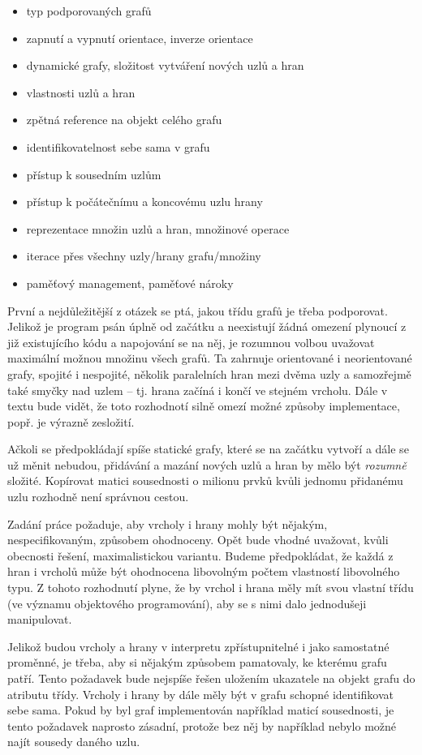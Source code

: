 \documentclass[11pt,twoside,a4paper]{book}
\begin{document}
\begin{itemize}
\item typ podporovaných grafů
\item zapnutí a vypnutí orientace, inverze orientace
\item dynamické grafy, složitost vytváření nových uzlů a hran
\item vlastnosti uzlů a hran
\item zpětná reference na objekt celého grafu
\item identifikovatelnost sebe sama v grafu
\item přístup k sousedním uzlům
\item přístup k počátečnímu a koncovému uzlu hrany
\item reprezentace množin uzlů a hran, množinové operace
\item iterace přes všechny uzly/hrany grafu/množiny
\item paměťový management, paměťové nároky
\end{itemize}

První a nejdůležitější z otázek se ptá, jakou třídu grafů je třeba podporovat. Jelikož je program psán úplně od začátku a neexistují žádná omezení plynoucí z již existujícího kódu a napojování se na něj, je rozumnou volbou uvažovat maximální možnou množinu všech grafů. Ta zahrnuje orientované i neorientované grafy, spojité i nespojité, několik paralelních hran mezi dvěma uzly a samozřejmě také smyčky nad uzlem -- tj. hrana začíná i končí ve stejném vrcholu. Dále v textu bude vidět, že toto rozhodnotí silně omezí možné způsoby implementace, popř. je výrazně zesložití.

Ačkoli se předpokládají spíše statické grafy, které se na začátku vytvoří a dále se už měnit nebudou, přidávání a mazání nových uzlů a hran by mělo být \textit{rozumně} složité. Kopírovat matici sousednosti o milionu prvků kvůli jednomu přidanému uzlu rozhodně není správnou cestou.

Zadání práce požaduje, aby vrcholy i hrany mohly být nějakým, nespecifikovaným, způsobem ohodnoceny. Opět bude vhodné uvažovat, kvůli obecnosti řešení, maximalistickou variantu. Budeme předpokládat, že každá z hran i vrcholů může být ohodnocena libovolným počtem vlastností libovolného typu. Z tohoto rozhodnutí plyne, že by vrchol i hrana měly mít svou vlastní třídu (ve významu objektového programování), aby se s nimi dalo jednodušeji manipulovat.

Jelikož budou vrcholy a hrany v interpretu zpřístupnitelné i jako samostatné proměnné, je třeba, aby si nějakým způsobem pamatovaly, ke kterému grafu patří. Tento požadavek bude nejspíše řešen uložením ukazatele na objekt grafu do atributu třídy. Vrcholy i hrany by dále měly být v grafu schopné identifikovat sebe sama. Pokud by byl graf implementován například maticí sousednosti, je tento požadavek naprosto zásadní, protože bez něj by například nebylo možné najít sousedy daného uzlu.
\end{document}
